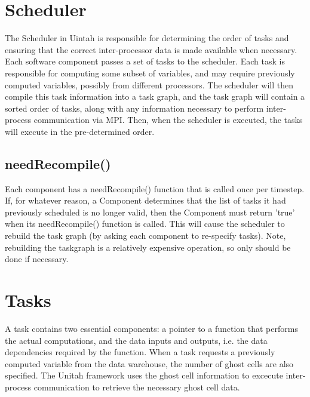 \documentclass[12pt]{report}
\begin{document}
\section{Scheduler}

The Scheduler in Uintah is responsible for determining the order of
tasks and ensuring that the correct inter-processor data is made
available when necessary. Each software component passes a set of
tasks to the scheduler. Each task is responsible for computing some
subset of variables, and may require previously computed variables,
possibly from different processors. The scheduler will then compile
this task information into a task graph, and the task graph will
contain a sorted order of tasks, along with any information necessary
to perform inter-process communication via MPI. Then, when the
scheduler is executed, the tasks will execute in the pre-determined
order.

\subsection{needRecompile()}


Each component has a needRecompile() function that is called once per
timestep.  If, for whatever reason, a Component determines that the
list of tasks it had previously scheduled is no longer valid, then the
Component must return 'true' when its needRecompile() function is
called.  This will cause the scheduler to rebuild the task graph (by
asking each component to re-specify tasks).  Note, rebuilding the
taskgraph is a relatively expensive operation, so only should be done
if necessary.

\section{Tasks}

A task contains two essential components: a pointer to a function
that performs the actual computations, and the data inputs and
outputs, i.e. the data dependencies required by the function.  When a
task requests a previously computed variable from the data warehouse,
the number of ghost cells are also specified.  The Unitah framework
uses the ghost cell information to excecute inter-process
communication to retrieve the necessary ghost cell data.
\end{document}
